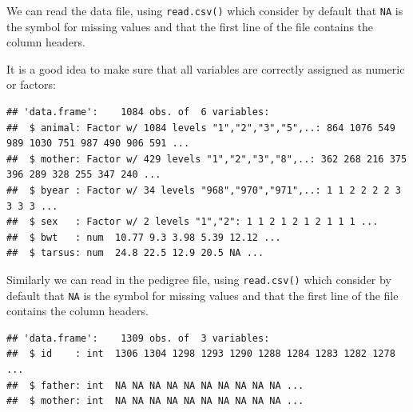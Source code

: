 \documentclass[
  12pt,
]{book}
\newenvironment{Shaded}{\begin{snugshade}}{\end{snugshade}}
\newcommand{\KeywordTok}[1]{\textcolor[rgb]{0.13,0.29,0.53}{\textbf{#1}}}
\newcommand{\NormalTok}[1]{#1}
\newcommand{\OperatorTok}[1]{\textcolor[rgb]{0.81,0.36,0.00}{\textbf{#1}}}
\newcommand{\StringTok}[1]{\textcolor[rgb]{0.31,0.60,0.02}{#1}}
\begin{document}
We can read the data file, using \texttt{read.csv()} which consider by default that \texttt{NA} is the symbol for missing values and that the first line of the file contains the column headers.

It is a good idea to make sure that all variables are correctly assigned as numeric or factors:

\begin{Shaded}
\end{Shaded}

\begin{verbatim}
## 'data.frame':    1084 obs. of  6 variables:
##  $ animal: Factor w/ 1084 levels "1","2","3","5",..: 864 1076 549 989 1030 751 987 490 906 591 ...
##  $ mother: Factor w/ 429 levels "1","2","3","8",..: 362 268 216 375 396 289 328 255 347 240 ...
##  $ byear : Factor w/ 34 levels "968","970","971",..: 1 1 2 2 2 2 3 3 3 3 ...
##  $ sex   : Factor w/ 2 levels "1","2": 1 1 2 1 2 1 2 1 1 1 ...
##  $ bwt   : num  10.77 9.3 3.98 5.39 12.12 ...
##  $ tarsus: num  24.8 22.5 12.9 20.5 NA ...
\end{verbatim}

Similarly we can read in the pedigree file, using \texttt{read.csv()} which consider by default that \texttt{NA} is the symbol for missing values and that the first line of the file contains the column headers.

\begin{verbatim}
## 'data.frame':    1309 obs. of  3 variables:
##  $ id    : int  1306 1304 1298 1293 1290 1288 1284 1283 1282 1278 ...
##  $ father: int  NA NA NA NA NA NA NA NA NA NA ...
##  $ mother: int  NA NA NA NA NA NA NA NA NA NA ...
\end{verbatim}
\end{document}
